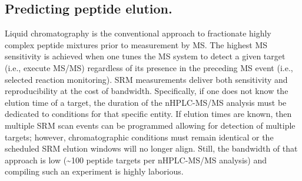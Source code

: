 \subsection*{Predicting peptide elution.}

Liquid chromatography is the conventional approach to fractionate highly complex peptide mixtures prior to measurement by MS. The highest MS sensitivity is achieved when one tunes the MS system to detect a given target (i.e., execute MS/MS) regardless of its presence in the preceding MS event (i.e., selected reaction monitoring). SRM measurements deliver both sensitivity and reproducibility at the cost of bandwidth. Specifically, if one does not know the elution time of a target, the duration of the nHPLC-MS/MS analysis must be dedicated to conditions for that specific entity. If elution times are known, then multiple SRM scan events can be programmed allowing for detection of multiple targets; however, chromatographic conditions must remain identical or the scheduled SRM elution windows will no longer align. Still, the bandwidth of that approach is low (\textasciitilde100 peptide targets per nHPLC-MS/MS analysis) and compiling such an experiment is highly laborious.\cite{indexion}

